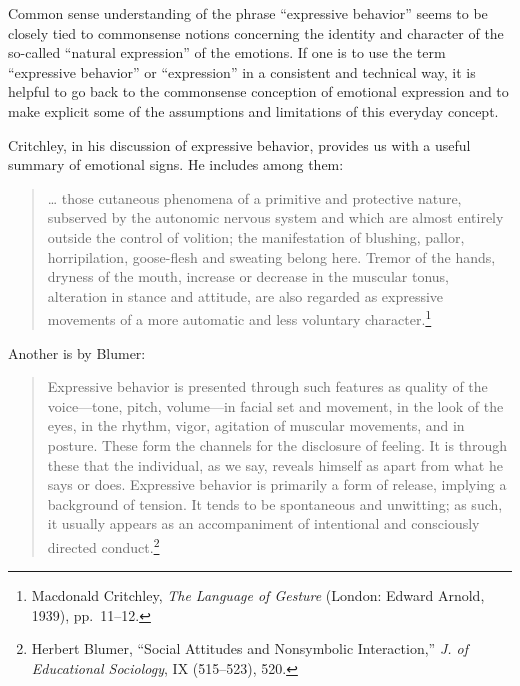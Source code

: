 \documentclass[openany,nobib]{tufte-book}
\begin{document}
Common sense understanding of the phrase ``expressive behavior'' seems
to be closely tied to commonsense notions concerning the identity and
character of the so-called ``natural expression'' of the emotions. If
one is to use the term ``expressive behavior'' or ``expression'' in a
consistent and technical way, it is helpful to go back to the
commonsense conception of emotional expression and to make explicit some
of the assumptions and limitations of this everyday concept.

Critchley, in his discussion of expressive behavior, provides us with a
useful summary of emotional signs. He includes among them:

\begin{quote}
\ldots{} those cutaneous phenomena of a primitive and protective nature,
subserved by the autonomic nervous system and which are almost entirely
outside the control of volition; the manifestation of blushing, pallor,
horripilation, goose-flesh and sweating belong here. Tremor of the
hands, dryness of the mouth, increase or decrease in the muscular tonus,
alteration in stance and attitude, are also regarded as expressive
movements of a more automatic and less voluntary character.\footnote{Macdonald
  Critchley, \emph{The Language of Gesture} (London: Edward Arnold,
  1939), pp.~11--12.}
\end{quote}

\noindent Another is by Blumer:

\begin{quote}
Expressive behavior is presented through such features as quality of the
voice---tone, pitch, volume---in facial set and movement, in the look of
the eyes, in the rhythm, vigor, agitation of muscular movements, and in
posture. These form the channels for the disclosure of feeling. It is
through these that the individual, as we say, reveals himself as apart
from what he says or does. Expressive behavior is primarily a form of
release, implying a background of tension. It tends to be spontaneous
and unwitting; as such, it usually appears as an accompaniment of
intentional and consciously directed conduct.\footnote{Herbert Blumer,
  ``Social Attitudes and Nonsymbolic Interaction,'' \emph{J. of
  Educational Sociology}, IX (515--523), 520.}
\end{quote}
\end{document}
